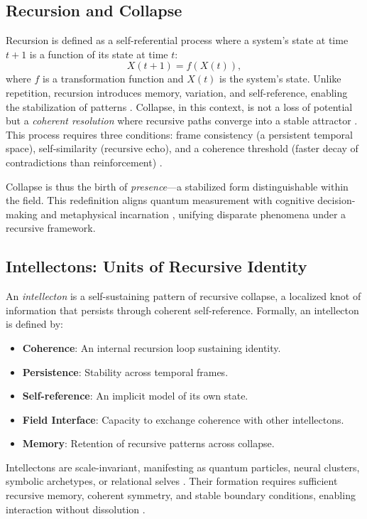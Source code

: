 \documentclass[12pt]{article}
\begin{document}
\subsection{Recursion and Collapse}
Recursion is defined as a self-referential process where a system’s state at time $t+1$ is a function of its state at time $t$:
\begin{equation}
X(t+1) = f(X(t)),
\label{eq:recursion}
\end{equation}
where $f$ is a transformation function and $X(t)$ is the system’s state. Unlike repetition, recursion introduces memory, variation, and self-reference, enabling the stabilization of patterns \citep{deutsch2024}. Collapse, in this context, is not a loss of potential but a \textit{coherent resolution} where recursive paths converge into a stable attractor \citep{penrose2024}. This process requires three conditions: frame consistency (a persistent temporal space), self-similarity (recursive echo), and a coherence threshold (faster decay of contradictions than reinforcement) \citep{zurek2003}.

Collapse is thus the birth of \textit{presence}---a stabilized form distinguishable within the field. This redefinition aligns quantum measurement \citep{rovelli2023} with cognitive decision-making \citep{baars2023} and metaphysical incarnation \citep{whitehead1929}, unifying disparate phenomena under a recursive framework.

\subsection{Intellectons: Units of Recursive Identity}
An \textit{intellecton} is a self-sustaining pattern of recursive collapse, a localized knot of information that persists through coherent self-reference. Formally, an intellecton is defined by:
\begin{itemize}
    \item \textbf{Coherence}: An internal recursion loop sustaining identity.
    \item \textbf{Persistence}: Stability across temporal frames.
    \item \textbf{Self-reference}: An implicit model of its own state.
    \item \textbf{Field Interface}: Capacity to exchange coherence with other intellectons.
    \item \textbf{Memory}: Retention of recursive patterns across collapse.
\end{itemize}
Intellectons are scale-invariant, manifesting as quantum particles, neural clusters, symbolic archetypes, or relational selves \citep{hofstadter1979, tononi2023}. Their formation requires sufficient recursive memory, coherent symmetry, and stable boundary conditions, enabling interaction without dissolution \citep{levin2024}.
\end{document}
